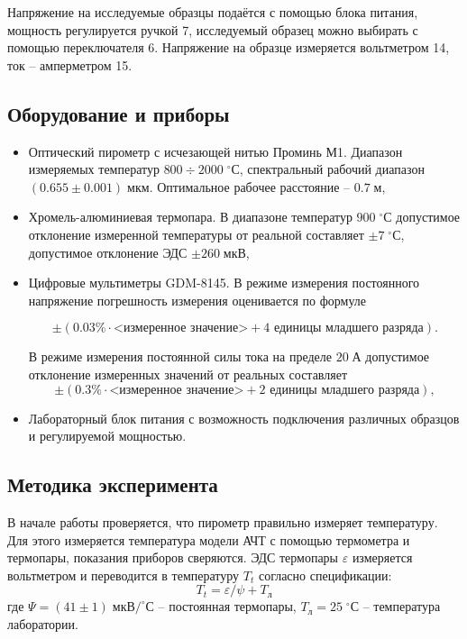 \documentclass[a4paper, 12pt]{article}
\newcommand{\m}{\; м}
\newcommand{\um}{\; мкм}
\newcommand{\A}{\; А}
\newcommand{\uV}{\; мкВ}
\newcommand{\cels}{\; ^\circ С}
\begin{document}
    Напряжение на исследуемые образцы подаётся с помощью блока питания, мощность регулируется ручкой 7, исследуемый образец можно выбирать с помощью переключателя 6. Напряжение на образце измеряется вольтметром 14, ток -- амперметром 15.

    \subsection{Оборудование и приборы}
		
    \begin{itemize}
        \item Оптический пирометр с исчезающей нитью Проминь М1. Диапазон измеряемых температур $800 \div 2000 \cels$, спектральный рабочий диапазон $\left( 0.655 \pm 0.001 \right) \um$. Оптимальное рабочее расстояние -- $0.7 \m$,
        
        \item Хромель-алюминиевая термопара. В диапазоне температур $900 \cels$ допустимое отклонение измеренной температуры от реальной составляет $\pm 7 \cels$, допустимое отклонение ЭДС $\pm 260 \uV$,
        
        \item Цифровые мультиметры GDM-8145. В режиме измерения постоянного напряжение погрешность измерения оценивается по формуле 
        
        $$
        \pm (0.03\% \cdot \text{<измеренное значение>} + 4 \text{ единицы младшего разряда}).
        $$
        
        В режиме измерения постоянной силы тока на пределе $20 \A$ допустимое отклонение измеренных значений от реальных составляет 
        $$
        \pm (0.3\% \cdot \text{<измеренное значение>} + 2\text{ единицы младшего разряда}),
        $$
        
        \item Лабораторный блок питания с возможность подключения различных образцов и регулируемой мощностью.
    \end{itemize}
	
    \subsection{Методика эксперимента}
	
    В начале работы проверяется, что пирометр правильно измеряет температуру. Для этого измеряется температура модели АЧТ с помощью термометра и термопары, показания приборов сверяются. ЭДС термопары $\varepsilon$ измеряется вольтметром и переводится в температуру $T_t$ согласно спецификации:
    $$
    T_t = \varepsilon / \psi + T_{л}
    $$
    где $\Psi = (41 \pm 1) \; мкВ/ ^\circ С$ -- постоянная термопары, $T_{л} = 25 \cels$ -- температура лаборатории.
	
\end{document}
